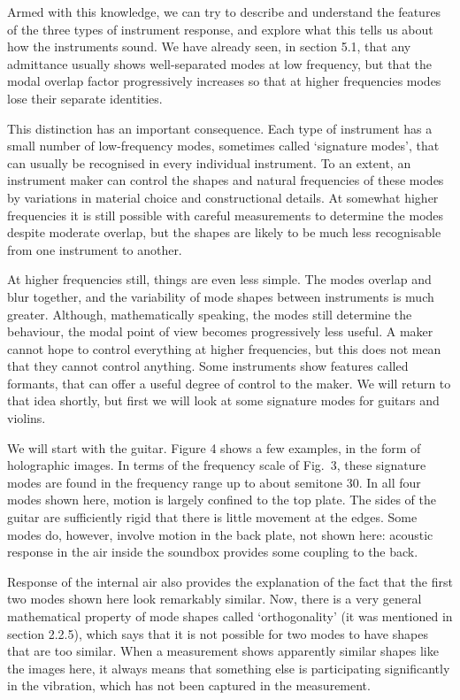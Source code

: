   Armed with this knowledge, we can try to describe and understand the features 
  of the three types of instrument response, and explore what this tells us 
  about how the instruments sound. We have already seen, in section 5.1, that 
  any admittance usually shows well-separated modes at low frequency, but that 
  the modal overlap factor progressively increases so that at higher 
  frequencies modes lose their separate identities. 

  This distinction has an important consequence. Each type of instrument has a 
  small number of low-frequency modes, sometimes called `signature modes', that 
  can usually be recognised in every individual instrument. To an extent, an 
  instrument maker can control the shapes and natural frequencies of these 
  modes by variations in material choice and constructional details. At 
  somewhat higher frequencies it is still possible with careful measurements to 
  determine the modes despite moderate overlap, but the shapes are likely to be 
  much less recognisable from one instrument to another. 

  At higher frequencies still, things are even less simple. The modes overlap 
  and blur together, and the variability of mode shapes between instruments is 
  much greater. Although, mathematically speaking, the modes still determine 
  the behaviour, the modal point of view becomes progressively less useful. A 
  maker cannot hope to control everything at higher frequencies, but this does 
  not mean that they cannot control anything. Some instruments show features 
  called formants, that can offer a useful degree of control to the maker. We 
  will return to that idea shortly, but first we will look at some signature 
  modes for guitars and violins. 

  We will start with the guitar. Figure 4 shows a few examples, in the form of 
  holographic images. In terms of the frequency scale of Fig.\ 3, these 
  signature modes are found in the frequency range up to about semitone 30. In 
  all four modes shown here, motion is largely confined to the top plate. The 
  sides of the guitar are sufficiently rigid that there is little movement at 
  the edges. Some modes do, however, involve motion in the back plate, not 
  shown here: acoustic response in the air inside the soundbox provides some 
  coupling to the back. 

  Response of the internal air also provides the explanation of the fact that 
  the first two modes shown here look remarkably similar. Now, there is a very 
  general mathematical property of mode shapes called `orthogonality' (it was 
  mentioned in section 2.2.5), which says that it is not possible for two modes 
  to have shapes that are too similar. When a measurement shows apparently 
  similar shapes like the images here, it always means that something else is 
  participating significantly in the vibration, which has not been captured in 
  the measurement. 

